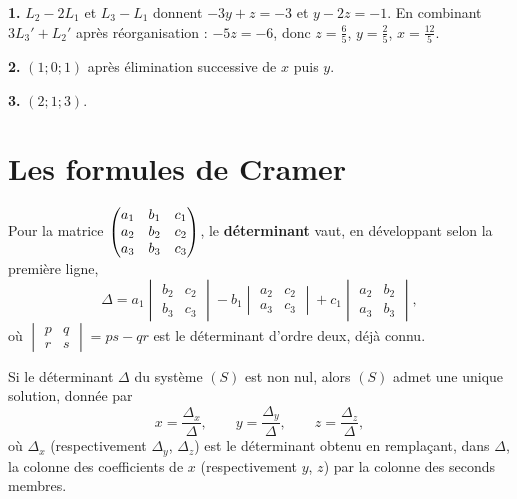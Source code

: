 \begin{corrige}
\textbf{1.} $L_{2}-2L_{1}$ et $L_{3}-L_{1}$ donnent $-3y+z=-3$ et $y-2z=-1$.
En combinant $3L_{3}'+L_{2}'$ après réorganisation : $-5z=-6$, donc
$z=\tfrac65$, $y=\tfrac25$, $x=\tfrac{12}{5}$.

\textbf{2.} $(1;0;1)$ après élimination successive de $x$ puis $y$.

\textbf{3.} $(2;1;3)$.
\end{corrige}

\section{Les formules de Cramer}

\begin{definition}
Pour la matrice
$\begin{pmatrix} a_{1} & b_{1} & c_{1} \\ a_{2} & b_{2} & c_{2} \\ a_{3} & b_{3} & c_{3} \end{pmatrix}$,
le \textbf{déterminant} vaut, en développant selon la première ligne,
\[
  \Delta = a_{1}\begin{vmatrix} b_{2} & c_{2} \\ b_{3} & c_{3} \end{vmatrix}
         - b_{1}\begin{vmatrix} a_{2} & c_{2} \\ a_{3} & c_{3} \end{vmatrix}
         + c_{1}\begin{vmatrix} a_{2} & b_{2} \\ a_{3} & b_{3} \end{vmatrix},
\]
où $\begin{vmatrix} p & q \\ r & s \end{vmatrix} = ps-qr$ est le déterminant
d'ordre deux, déjà connu.
\end{definition}

\begin{theoreme}
Si le déterminant $\Delta$ du système $(S)$ est non nul, alors $(S)$ admet une
unique solution, donnée par
\[
  x = \frac{\Delta_{x}}{\Delta}, \qquad
  y = \frac{\Delta_{y}}{\Delta}, \qquad
  z = \frac{\Delta_{z}}{\Delta},
\]
où $\Delta_{x}$ (respectivement $\Delta_{y}$, $\Delta_{z}$) est le
déterminant obtenu en remplaçant, dans $\Delta$, la colonne des coefficients
de $x$ (respectivement $y$, $z$) par la colonne des seconds membres.
\end{theoreme}

